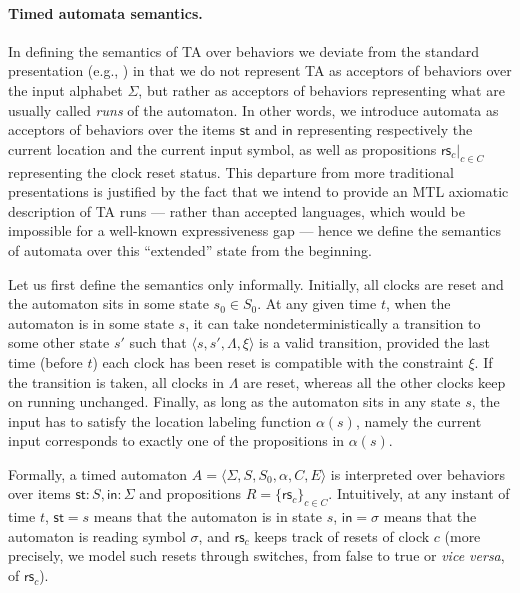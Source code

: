 \documentclass[a4paper]{article}
\newcommand{\st}{\mathsf{st}}
\newcommand{\inpt}{\mathsf{in}}
\newcommand{\rest}[1]{\mathsf{rs}_{#1}}
\theoremstyle{plain}
\theoremstyle{definition}
\begin{document}
\paragraph{Timed automata semantics.}
In defining the semantics of TA over behaviors we deviate from the standard presentation (e.g., \cite{AFH96,MNP06}) in that we do not represent TA as acceptors of behaviors over the input alphabet $\Sigma$, but rather as acceptors of behaviors representing what are usually called \emph{runs} of the automaton.
In other words, we introduce automata as acceptors of behaviors over the items $\st$ and $\inpt$ representing respectively the current location and the current input symbol, as well as propositions $\rest{c}|_{c\in C}$ representing the clock reset status.
This departure from more traditional presentations is justified by the fact that we intend to provide an MTL axiomatic description of TA runs --- rather than accepted languages, which would be impossible for a well-known expressiveness gap \cite{HRS98} --- hence we define the semantics of automata over this ``extended'' state from the beginning.

Let us first define the semantics only informally.
Initially, all clocks are reset and the automaton sits in some state $s_0 \in S_0$.
At any given time $t$, when the automaton is in some state $s$, it can take nondeterministically a transition to some other state $s'$ such that $\langle s, s', \Lambda, \xi \rangle$ is a valid transition, provided the last time (before $t$) each clock has been reset is compatible with the constraint $\xi$.
If the transition is taken, all clocks in $\Lambda$ are reset, whereas all the other clocks keep on running unchanged.
Finally, as long as the automaton sits in any state $s$, the input has to satisfy the location labeling function $\alpha(s)$, namely the current input corresponds to exactly one of the propositions in $\alpha(s)$.

Formally, a timed automaton $A = \langle \Sigma, S, S_0, \alpha, C, E \rangle$ is interpreted over behaviors over items $\st: S, \inpt: \Sigma$ and propositions $R = \{\rest{c}\}_{c \in C}$.
Intuitively, at any instant of time $t$, $\st = s$ means that the automaton is in state $s$, $\inpt = \sigma$ means that the automaton is reading symbol $\sigma$, and $\rest{c}$ keeps track of resets of clock $c$ (more precisely, we model such resets through switches, from false to true or \emph{vice versa}, of $\rest{c}$).
\end{document}
